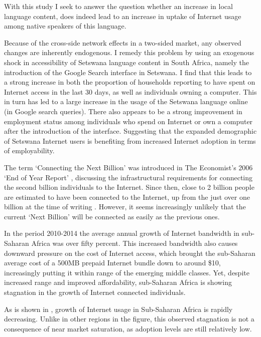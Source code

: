 \documentclass[a4paper,british]{article}\usepackage[]{graphicx}\usepackage[]{xcolor}
\begin{document}
With this study I seek to answer the question whether an increase
in local language content, does indeed lead to an increase in uptake
of Internet usage among native speakers of this language.

Because of the cross-side network effects in a two-sided market, any
observed changes are inherently endogenous. I remedy this problem
by using an exogenous shock in accessibility of Setswana language
content in South Africa, namely the introduction of the Google Search
interface in Setswana. I find that this leads to a strong increase
in both the proportion of households reporting to have spent on Internet
access in the last 30 days, as well as individuals owning a computer.
This in turn has led to a large increase in the usage of the Setswana
language online (in Google search queries). There also appears to
be a strong improvement in employment status among individuals who
spend on Internet or own a computer after the introduction of the
interface. Suggesting that the expanded demographic of Setswana Internet
users is benefiting from increased Internet adoption in terms of employability.

The term `Connecting the Next Billion' was introduced in The Economist's
2006 `End of Year Report' \citep{standage2006connecting}, discussing
the infrastructural requirements for connecting the second billion
individuals to the Internet. Since then, close to 2 billion people
are\emph{ }estimated to have been connected to the Internet, up from
the just over one billion at the time of writing \citep{sanou2015world}.
However, it seems increasingly unlikely that the current `Next Billion'
will be connected as easily as the previous ones. 

In the period 2010-2014 the average annual growth of Internet bandwidth
in sub-Saharan Africa was over fifty percent. This increased bandwidth
also causes downward pressure on the cost of Internet access, which
brought the sub-Saharan average cost of a 500MB prepaid Internet bundle
down to around \$10, increasingly putting it within range of the emerging
middle classes. Yet, despite increased range and improved affordability,
sub-Saharan Africa is showing stagnation in the growth of Internet
connected individuals.

As is shown in , growth of Internet usage
in Sub-Saharan Africa is rapidly decreasing. Unlike in other regions
in the figure, this observed stagnation is not a consequence of near
market saturation, as adoption levels are still relatively low.
\end{document}
